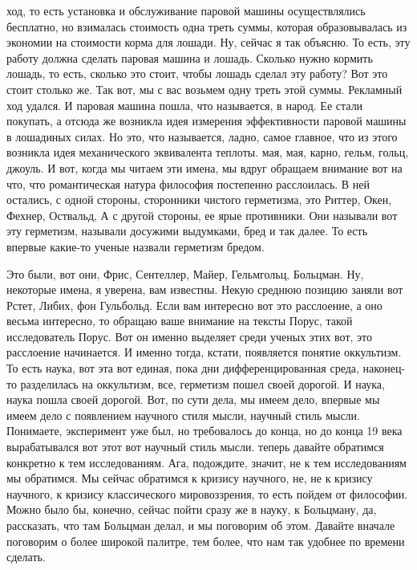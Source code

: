 ход, то есть установка и обслуживание паровой машины осуществлялись бесплатно,
но взималась стоимость одна треть суммы, которая образовывалась из экономии на
стоимости корма для лошади. Ну, сейчас я так объясню. То есть, эту работу должна
сделать паровая машина и лошадь. Сколько нужно кормить лошадь, то есть, сколько
это стоит, чтобы лошадь сделал эту работу? Вот это стоит столько же. Так вот, мы
с вас возьмем одну треть этой суммы. Рекламный ход удался. И паровая машина
пошла, что называется, в народ. Ее стали покупать, а отсюда же возникла идея
измерения эффективности паровой машины в лошадиных силах. Но это, что
называется, ладно, самое главное, что из этого возникла идея механического
эквивалента теплоты. мая, мая, карно, гельм, гольц, джоуль. И вот, когда мы
читаем эти имена, мы вдруг обращаем внимание вот на что, что романтическая
натура философия постепенно расслоилась. В ней остались, с одной стороны,
сторонники чистого герметизма, это Риттер, Окен, Фехнер, Оствальд, А с другой
стороны, ее ярые противники. Они называли вот эту герметизм, называли досужими
выдумками, бред и так далее. То есть впервые какие-то ученые назвали герметизм
бредом.

Это были, вот они, Фрис, Сентеллер, Майер, Гельмгольц, Больцман. Ну,
некоторые имена, я уверена, вам известны. Некую среднюю позицию заняли вот
Рстет, Либих, фон Гульбольд. Если вам интересно вот это расслоение, а оно весьма
интересно, то обращаю ваше внимание на тексты Порус, такой исследователь Порус.
Вот он именно выделяет среди ученых этих вот, это расслоение начинается. И
именно тогда, кстати, появляется понятие оккультизм. То есть наука, вот эта вот
единая, пока дни дифференцированная среда, наконец-то разделилась на оккультизм,
все, герметизм пошел своей дорогой. И наука, наука пошла своей дорогой. Вот, по
сути дела, мы имеем дело, впервые мы имеем дело с появлением научного стиля
мысли, научный стиль мысли. Понимаете, эксперимент уже был, но требовалось до
конца, но до конца 19 века вырабатывался вот этот вот научный стиль мысли.
теперь давайте обратимся конкретно к тем исследованиям. Ага, подождите, значит,
не к тем исследованиям мы обратимся. Мы сейчас обратимся к кризису научного, не,
не к кризису научного, к кризису классического мировоззрения, то есть пойдем от
философии. Можно было бы, конечно, сейчас пойти сразу же в науку, к Больцману,
да, рассказать, что там Больцман делал, и мы поговорим об этом. Давайте вначале
поговорим о более широкой палитре, тем более, что нам так удобнее по времени
сделать. 

